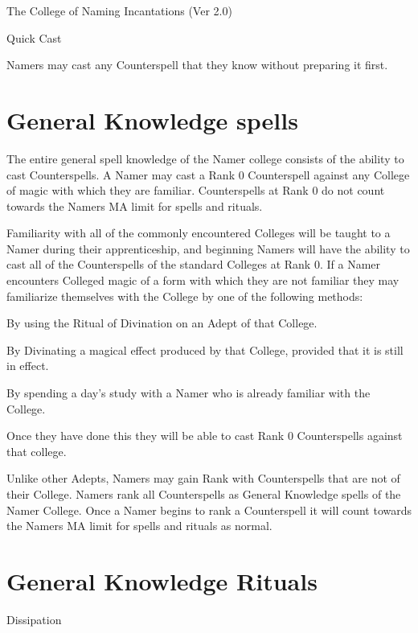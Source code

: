 \begin{Chapter}{The College of Naming Incantations (Ver 2.0)}
\begin{talent}[T-3]{Quick Cast}

\begin{effects}
Namers may cast any Counterspell that they know without preparing it
first.
\end{effects}
\end{talent}

\section{General Knowledge spells}

The entire general spell knowledge of the Namer college consists of
the ability to cast Counterspells.  A Namer may cast a Rank 0
Counterspell against any College of magic with which they are
familiar.  Counterspells at Rank 0 do not count towards the Namers MA
limit for spells and rituals.

Familiarity with all of the commonly encountered Colleges will be
taught to a Namer during their apprenticeship, and beginning Namers
will have the ability to cast all of the Counterspells of the standard
Colleges at Rank 0. If a Namer encounters Colleged magic of a form
with which they are not familiar they may familiarize themselves with
the College by one of the following methods:
\begin{Itemize}
\item By using the Ritual of Divination on an Adept of that College.
\item By Divinating a magical effect produced by that College,
  provided that it is still in effect.
\item By spending a day’s study with a Namer who is already familiar
  with the College.
\end{Itemize}
Once they have done this they will be able to cast Rank 0
Counterspells against that college.

Unlike other Adepts, Namers may gain Rank with Counterspells that are
not of their College. Namers rank all Counterspells as General
Knowledge spells of the Namer College.  Once a Namer begins to rank a
Counterspell it will count towards the Namers MA limit for spells and
rituals as normal.


\section{General Knowledge Rituals}


\begin{ritual}[Q-1]{Dissipation}



\end{ritual}
\end{Chapter}
